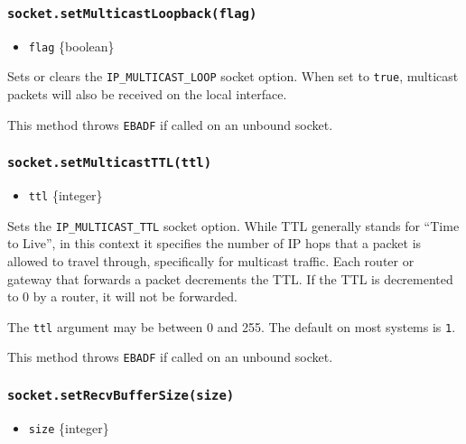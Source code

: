 \subsubsection{\texorpdfstring{\texttt{socket.setMulticastLoopback(flag)}}{socket.setMulticastLoopback(flag)}}\label{socket.setmulticastloopbackflag}

\begin{itemize}
\tightlist
\item
  \texttt{flag} \{boolean\}
\end{itemize}

Sets or clears the \texttt{IP\_MULTICAST\_LOOP} socket option. When set
to \texttt{true}, multicast packets will also be received on the local
interface.

This method throws \texttt{EBADF} if called on an unbound socket.

\subsubsection{\texorpdfstring{\texttt{socket.setMulticastTTL(ttl)}}{socket.setMulticastTTL(ttl)}}\label{socket.setmulticastttlttl}

\begin{itemize}
\tightlist
\item
  \texttt{ttl} \{integer\}
\end{itemize}

Sets the \texttt{IP\_MULTICAST\_TTL} socket option. While TTL generally
stands for ``Time to Live'', in this context it specifies the number of
IP hops that a packet is allowed to travel through, specifically for
multicast traffic. Each router or gateway that forwards a packet
decrements the TTL. If the TTL is decremented to 0 by a router, it will
not be forwarded.

The \texttt{ttl} argument may be between 0 and 255. The default on most
systems is \texttt{1}.

This method throws \texttt{EBADF} if called on an unbound socket.

\subsubsection{\texorpdfstring{\texttt{socket.setRecvBufferSize(size)}}{socket.setRecvBufferSize(size)}}\label{socket.setrecvbuffersizesize}

\begin{itemize}
\tightlist
\item
  \texttt{size} \{integer\}
\end{itemize}

